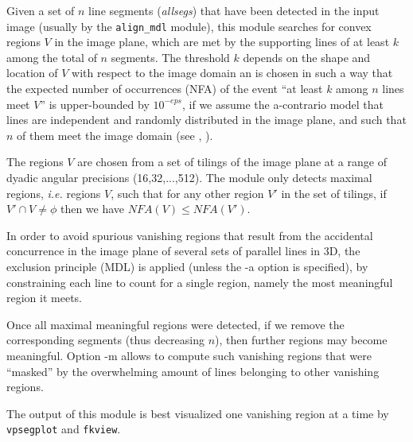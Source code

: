 Given a set of $n$ line segments (\emph{allsegs}) that have been detected in the input image (usually by the \verb+align_mdl+ module), this module searches for convex regions $V$ in the image plane, which are met by the supporting lines of at least $k$ among the total of $n$ segments. The threshold $k$ depends on the shape and location of $V$ with respect to the image domain an is chosen in such a way that the expected number of occurrences (NFA) of the event ``at least $k$ among $n$ lines meet $V$'' is upper-bounded by $10^{-eps}$, if we assume the a-contrario model that lines are independent and randomly distributed in the image plane, and such that $n$ of them meet the image domain (see \cite{almansa.desolneux.vamech:vanish}, \cite{almansa:phd}).

The regions $V$ are chosen from a set of tilings of the image plane at a range of dyadic angular precisions (16,32,...,512). The module only detects maximal regions, \emph{i.e.} regions $V$, such that for any other region $V'$ in the set of tilings, if $V'\cap V \neq \phi$ then we have $NFA(V)\leq NFA(V')$.

In order to avoid spurious vanishing regions that result from the accidental concurrence in the image plane of several sets of parallel lines in 3D, the exclusion principle (MDL) 
is applied (unless the -a option is specified), by constraining each line to count for a single region, namely the most meaningful region it meets.

Once all maximal meaningful regions were detected, if we remove the corresponding segments (thus decreasing $n$), then further regions may become meaningful. Option -m allows to compute such vanishing regions that were ``masked'' by the overwhelming amount of lines belonging to other vanishing regions.

The output of this module is best visualized one vanishing region at a time by \verb+vpsegplot+ and \verb+fkview+.

